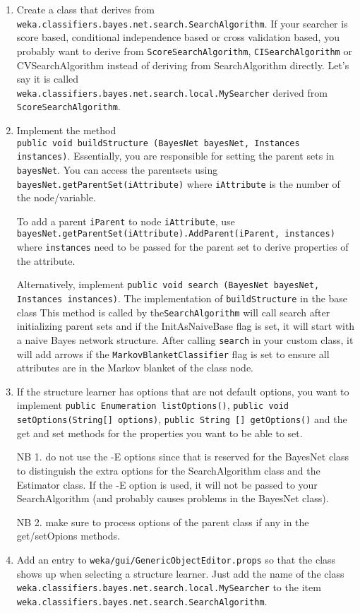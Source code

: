 \documentclass{article}
\begin{document}
\begin{enumerate}
\item Create a class that derives from {\tt weka.classifiers.bayes.net.search.SearchAlgorithm}.
  If your searcher is score based, conditional independence based or cross validation based, you
  probably want to derive from {\tt ScoreSearchAlgorithm}, {\tt CISearchAlgorithm} or {CVSearchAlgorithm}
  instead of deriving from SearchAlgorithm directly.
  Let's say it is called \\{\tt weka.classifiers.bayes.net.search.local.MySearcher}
  derived from {\tt ScoreSearchAlgorithm}.

\item Implement the method\\
{\tt         public void buildStructure (BayesNet bayesNet, Instances instances)}.
Essentially, you are responsible for setting the parent sets in {\tt bayesNet}.
You can access the parentsets using {\tt bayesNet.getParentSet(iAttribute)} where
{\tt iAttribute} is the number of the node/variable.

To add a parent {\tt iParent} to node {\tt iAttribute}, use\\ 
{\tt bayesNet.getParentSet(iAttribute).AddParent(iParent, instances)} where
{\tt instances} need to be passed for the parent set to derive properties of
the attribute.


Alternatively, implement
{\tt         public void search (BayesNet bayesNet, Instances instances)}.
The implementation of {\tt buildStructure} in the base class
This method is called by the{\tt  SearchAlgorithm} will call search
after initializing parent sets and if the InitAsNaiveBase flag is set, it will
start with a naive Bayes network structure. After calling {\tt search} in your
custom class, it will add arrows if the {\tt MarkovBlanketClassifier} flag is 
set to ensure all attributes are in the Markov blanket of the class node.

\item If the structure learner has options that are not default options,
you want to implement {\tt public Enumeration listOptions()},
{\tt public void setOptions(String[] options)},
{\tt public String [] getOptions()} and the get and set methods for
the properties you want to be able to set.

NB 1. do not use the -E options since that is reserved for the BayesNet class to 
distinguish the extra options for the SearchAlgorithm class and the Estimator class.
If the -E option is used, it will not be passed to your SearchAlgorithm (and
probably causes problems in the BayesNet class).

NB 2. make sure to process options of the parent class if any in the get/setOpions
methods.

\item Add an entry to {\tt weka/gui/GenericObjectEditor.props} so that the class 
shows up when selecting a structure learner. Just add the name of the
class\\ {\tt weka.classifiers.bayes.net.search.local.MySearcher}
to the item\\ {\tt weka.classifiers.bayes.net.search.SearchAlgorithm}.
\end{enumerate}
\end{document}
